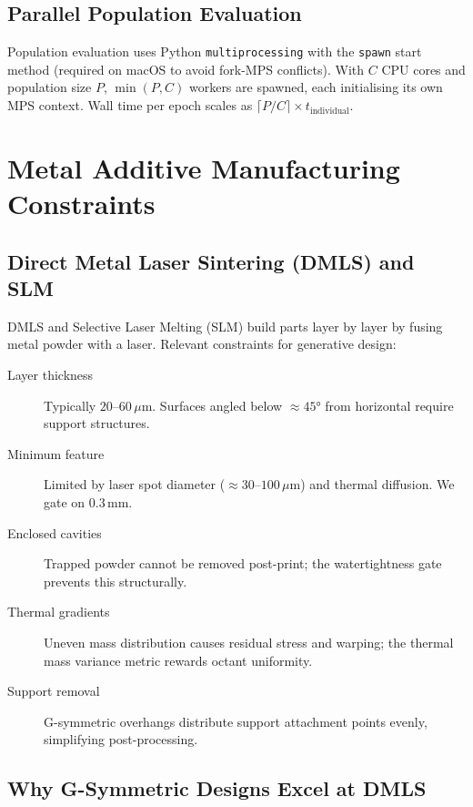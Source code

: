 \documentclass[11pt, a4paper]{article}
\begin{document}
\subsection{Parallel Population Evaluation}

Population evaluation uses Python \texttt{multiprocessing} with the
\texttt{spawn} start method (required on macOS to avoid fork-MPS conflicts).
With $C$ CPU cores and population size $P$, $\min(P, C)$ workers are spawned,
each initialising its own MPS context. Wall time per epoch scales as
$\lceil P / C \rceil \times t_{\mathrm{individual}}$.

\section{Metal Additive Manufacturing Constraints}
\label{sec:print}

\subsection{Direct Metal Laser Sintering (DMLS) and SLM}

DMLS and Selective Laser Melting (SLM) build parts layer by layer by fusing
metal powder with a laser. Relevant constraints for generative design:

\begin{description}
  \item[Layer thickness] Typically $20$--$60\,\mu\mathrm{m}$. Surfaces
    angled below $\approx 45°$ from horizontal require support structures.
  \item[Minimum feature] Limited by laser spot diameter ($\approx 30$--$100\,\mu\mathrm{m}$) and thermal diffusion. We gate on $0.3\,\mathrm{mm}$.
  \item[Enclosed cavities] Trapped powder cannot be removed post-print; the watertightness gate prevents this structurally.
  \item[Thermal gradients] Uneven mass distribution causes residual stress and warping; the thermal mass variance metric rewards octant uniformity.
  \item[Support removal] G-symmetric overhangs distribute support attachment points evenly, simplifying post-processing.
\end{description}

\subsection{Why G-Symmetric Designs Excel at DMLS}
\end{document}
